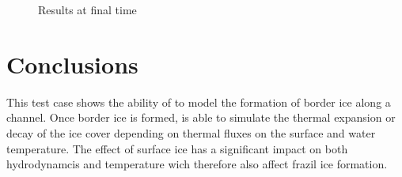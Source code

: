 \begin{figure}[H]
\begin{minipage}[t]{\textwidth}
 \centering
\end{minipage}
\begin{minipage}[t]{\textwidth}
 \centering
\end{minipage}
\begin{minipage}[t]{\textwidth}
 \centering
\end{minipage}
\begin{minipage}[t]{\textwidth}
 \centering
\end{minipage}
\begin{minipage}[t]{\textwidth}
 \centering
\end{minipage}
  \caption{Results at final time}\label{fig:res}
\end{figure}

\section{Conclusions}
This test case shows the ability of \khione to model the formation of border ice along a channel. Once border ice is formed, \khione is able to simulate the thermal expansion or decay of the ice cover depending on thermal fluxes on the surface and water temperature. The effect of surface ice has a significant impact on both hydrodynamcis and temperature wich therefore also affect frazil ice formation.

\renewcommand{\labelitemi}{\textbullet}
